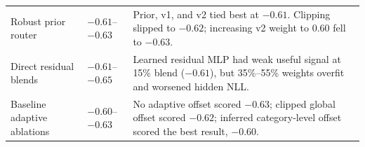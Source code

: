\documentclass{article}
\begin{document}
\begin{longtable}{@{}>{\raggedright\arraybackslash}p{}>{\raggedright\arraybackslash}p{}>{\raggedright\arraybackslash}p{}@{}}
Robust prior router & $-0.61$--$-0.63$ & Prior, v1, and v2 tied best at $-0.61$. Clipping slipped to $-0.62$; increasing v2 weight to 0.60 fell to $-0.63$. \\
Direct residual blends & $-0.61$--$-0.65$ & Learned residual MLP had weak useful signal at 15\% blend ($-0.61$), but 35\%--55\% weights overfit and worsened hidden NLL. \\
Baseline adaptive ablations & $-0.60$--$-0.63$ & No adaptive offset scored $-0.63$; clipped global offset scored $-0.62$; inferred category-level offset scored the best result, $-0.60$. \\
\bottomrule
\end{longtable}
\normalsize
\end{document}
